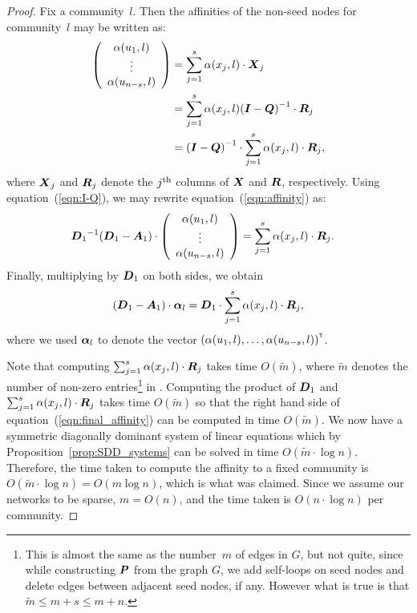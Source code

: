 \begin{proof}
Fix a community~$l$. Then the affinities of the non-seed nodes 
for community~$l$ may be written as:
\begin{align} \label{eqn:affinity}
	\left ( \begin{array}{c}
		\alpha (u_1, l) \\
		\vdots			\\
		\alpha (u_{n - s}, l)
	\end{array}	\right ) & = \sum_{j = 1}^{s} \alpha (x_j, l) \cdot \boldsymbol{X}_j \nonumber \\ 
						 & = \sum_{j = 1}^{s} \alpha (x_j, l) {(\boldsymbol{I} - \boldsymbol{Q})}^{-1} \cdot \boldsymbol{R}_j \nonumber \\ 
						 & = {(\boldsymbol{I} - \boldsymbol{Q})}^{-1} \cdot \sum_{j = 1}^{s} \alpha (x_j, l) \cdot \boldsymbol{R}_j,
\end{align}
where $\boldsymbol{X}_j$ and $\boldsymbol{R}_j$ denote the $j^{\textrm{th}}$ columns of $\boldsymbol{X}$ and $\boldsymbol{R}$, respectively. 
Using equation~(\ref{eqn:I-Q}), we may rewrite equation~(\ref{eqn:affinity}) as:
\begin{align}
	{\ensuremath{\boldsymbol{D}}_1}^{-1} (\boldsymbol{D}_1 - \boldsymbol{A}_1) \cdot \left ( \begin{array}{c}
		\alpha (u_1, l) \\
		\vdots			\\
		\alpha (u_{n - s}, l)
	\end{array}	\right ) & = \sum_{j = 1}^{s} \alpha (x_j, l) \cdot \boldsymbol{R}_j.
\end{align}
Finally, multiplying by $\boldsymbol{D}_1$ on both sides, we obtain
\begin{equation}\label{eqn:final_affinity}
	(\boldsymbol{D}_1 - \boldsymbol{A}_1) \cdot \boldsymbol{\alpha}_l = \boldsymbol{D}_1 \cdot \sum_{j = 1}^{s} \alpha (x_j, l) \cdot \boldsymbol{R}_j,
\end{equation}
where we used $\boldsymbol{\alpha}_l$ to denote the vector ${\left ( \alpha (u_1, l), \ldots, \alpha (u_{n-s}, l) \right )}^{\scriptscriptstyle \mathsf{T}}$.

Note that computing $\sum_{j = 1}^{s} \alpha (x_j, l) \cdot \boldsymbol{R}_j$ takes time $O(\tilde{m})$, where $\tilde{m}$ 
denotes the number of non-zero entries\footnote{This is almost the same as the 
number~$m$ of edges in $G$, but not quite, since while constructing $\boldsymbol{P}$ from the graph $G$, 
we add self-loops on seed nodes and delete edges between adjacent seed nodes, if any. However what is true is 
that $\tilde{m} \leq m + s \leq m + n$.} in . 
Computing the product of $\boldsymbol{D}_1$ and $\sum_{j = 1}^{s} \alpha (x_j, l) \cdot \boldsymbol{R}_j$ 
takes time $O(\tilde{m})$ so that the right hand side of equation~(\ref{eqn:final_affinity}) can 
be computed in time $O(\tilde{m})$. We now have a symmetric diagonally dominant system of linear equations 
which by Proposition~\ref{prop:SDD_systems} can be solved in time $O(\tilde{m} \cdot \log n)$. Therefore,
the time taken to compute the affinity to a fixed community is $O(\tilde{m} \cdot \log n) = O(m \log n)$,
which is what was claimed. Since we assume our networks to be sparse, $m = O(n)$, and 
the time taken is $O(n \cdot \log n)$ per community.  
\end{proof}

